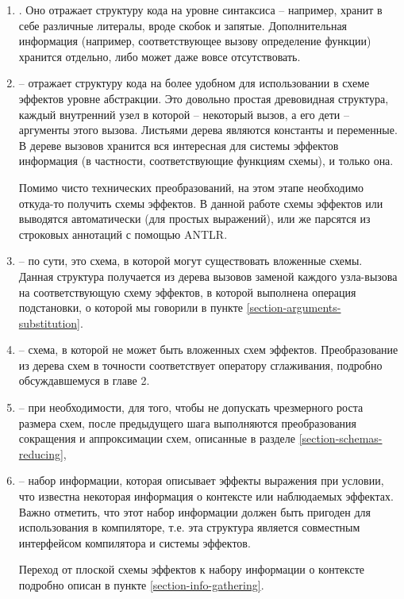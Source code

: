 \begin{enumerate}
  \item {}. Оно отражает структуру кода на уровне синтаксиса -- например, хранит в себе различные литералы, вроде скобок и запятые. Дополнительная информация (например, соответствующее вызову определение функции) хранится отдельно, либо может даже вовсе отсутствовать.

  \item {} -- отражает структуру кода на более удобном для использовании в схеме эффектов уровне абстракции. Это довольно простая древовидная структура, каждый внутренний узел в которой -- некоторый вызов, а его дети -- аргументы этого вызова. Листьями дерева являются константы и переменные. В дереве вызовов хранится вся интересная для системы эффектов информация (в частности, соответствующие функциям схемы), и только она.

  Помимо чисто технических преобразований, на этом этапе необходимо откуда-то получить схемы эффектов. В данной работе схемы эффектов или выводятся автоматически (для простых выражений), или же парсятся из строковых аннотаций с помощью ANTLR.

  \item {} -- по сути, это схема, в которой могут существовать вложенные схемы. Данная структура получается из дерева вызовов заменой каждого узла-вызова на соответствующую схему эффектов, в которой выполнена операция подстановки, о которой мы говорили в пункте \ref{section-arguments-substitution}.

  \item {} -- схема, в которой не может быть вложенных схем эффектов. Преобразование из дерева схем в точности соответствует оператору сглаживания, подробно обсуждавшемуся в главе 2.

  \item {} -- при необходимости, для того, чтобы не допускать чрезмерного роста размера схем, после предыдущего шага выполняются преобразования сокращения и аппроксимации схем, описанные в разделе \ref{section-schemas-reducing},

  \item {} -- набор информации, которая описывает эффекты выражения при условии, что известна некоторая информация о контексте или наблюдаемых эффектах. Важно отметить, что этот набор информации должен быть пригоден для использования в компиляторе, т.е. эта структура является совместным интерфейсом компилятора и системы эффектов.

  Переход от плоской схемы эффектов к набору информации о контексте подробно описан в пункте \ref{section-info-gathering}.
\end{enumerate}

